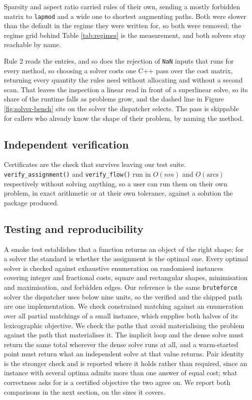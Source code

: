 Sparsity and aspect ratio carried rules of their own, sending a mostly
forbidden matrix to \texttt{lapmod} and a wide one to shortest augmenting paths. Both
were slower than the default in the regime they were written for, so both were
removed; the regime grid behind Table \ref{tab:regimes} is the measurement, and
both solvers stay reachable by name.

Rule 2 reads the entries, and so does the rejection of \texttt{NaN} inputs that runs
for every method, so choosing a solver costs one C++ pass over the cost matrix,
returning every quantity the rules need without allocating and without a second
scan. That leaves the inspection a linear read in front of a superlinear
solve, so its share of the runtime falls as problems grow, and the dashed line in
Figure \ref{fig:solver-bench} sits on the solver the dispatcher selects. The
pass is skippable for callers who already know the shape of their problem, by
naming the method.

\subsection{Independent verification}\label{independent-verification}

Certificates are the check that survives leaving our test suite. \texttt{verify\_assignment()} and \texttt{verify\_flow()} run in \(O(nm)\) and
\(O(\text{arcs})\) respectively without solving anything, so a user can run them
on their own problem, in exact arithmetic or at their own tolerance, against a
solution the package produced.

\subsection{Testing and reproducibility}\label{testing-and-reproducibility}

A smoke test establishes that a function returns an object of the right shape;
for a solver the standard is whether the assignment is the optimal one. Every
optimal solver is checked against exhaustive enumeration on randomised
instances covering integer and fractional costs, square and rectangular
shapes, minimisation and maximisation, and forbidden edges. Our reference is
the same \texttt{bruteforce} solver the dispatcher uses below nine units, so the
verified and the shipped path are one implementation. We check constrained
matching against an enumeration over all partial matchings of a small
instance, which supplies both halves of its lexicographic objective. We check
the paths that avoid materialising the problem against the path that materialises it. The implicit loop and the dense solve must return the same
total wherever the dense solve runs at all, and a warm-started point must return
what an independent solve at that value returns. Pair identity is the stronger
check and is reported where it holds rather than required, since an instance
with several optima admits more than one answer of equal cost; what correctness
asks for is a certified objective the two agree on. We report both comparisons
in the next section, on the sizes it covers.

